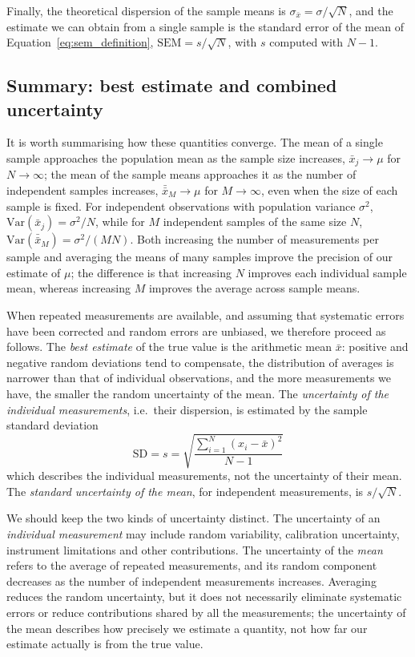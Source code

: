 \documentclass[letterpaper,11pt,leqno]{book}
\begin{document}
Finally, the theoretical dispersion of the sample means is $\sigma_{\bar{x}} = \sigma/\sqrt{N}$, and the estimate we can obtain from a single sample is the standard error of the mean of Equation~\eqref{eq:sem_definition}, $\text{SEM} = s/\sqrt{N}$, with $s$ computed with $N - 1$.

\subsection{Summary: best estimate and combined uncertainty}
\label{sec:summary_discrete}

It is worth summarising how these quantities converge. The mean of a single sample approaches the population mean as the sample size increases, $\bar{x}_j \to \mu$ for $N \to \infty$; the mean of the sample means approaches it as the number of independent samples increases, $\bar{\bar{x}}_M \to \mu$ for $M \to \infty$, even when the size of each sample is fixed. For independent observations with population variance $\sigma^2$, $\text{Var}(\bar{x}_j) = \sigma^2/N$, while for $M$ independent samples of the same size $N$, $\text{Var}(\bar{\bar{x}}_M) = \sigma^2/(MN)$. Both increasing the number of measurements per sample and averaging the means of many samples improve the precision of our estimate of $\mu$; the difference is that increasing $N$ improves each individual sample mean, whereas increasing $M$ improves the average across sample means.

When repeated measurements are available, and assuming that systematic errors have been corrected and random errors are unbiased, we therefore proceed as follows. The \emph{best estimate} of the true value is the arithmetic mean $\bar{x}$: positive and negative random deviations tend to compensate, the distribution of averages is narrower than that of individual observations, and the more measurements we have, the smaller the random uncertainty of the mean. The \emph{uncertainty of the individual measurements}, i.e.\ their dispersion, is estimated by the sample standard deviation
\begin{equation}
\boxed{\text{SD} = s = \sqrt{\frac{\sum_{i=1}^{N}(x_i - \bar{x})^2}{N - 1}}}
\label{eq:sd_summary}
\end{equation}
which describes the individual measurements, not the uncertainty of their mean. The \emph{standard uncertainty of the mean}, for independent measurements, is $s/\sqrt{N}$.

We should keep the two kinds of uncertainty distinct. The uncertainty of an \emph{individual measurement} may include random variability, calibration uncertainty, instrument limitations and other contributions. The uncertainty of the \emph{mean} refers to the average of repeated measurements, and its random component decreases as the number of independent measurements increases. Averaging reduces the random uncertainty, but it does not necessarily eliminate systematic errors or reduce contributions shared by all the measurements; the uncertainty of the mean describes how precisely we estimate a quantity, not how far our estimate actually is from the true value.
\end{document}
